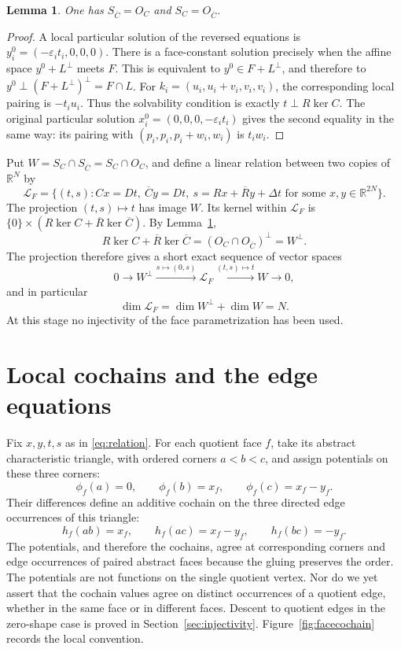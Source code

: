 \documentclass[11pt]{article}
\newtheorem{lemma}[theorem]{Lemma}
\theoremstyle{definition}\newtheorem{definition}[theorem]{Definition}
\theoremstyle{remark}\newtheorem{remark}[theorem]{Remark}
\newcommand{\R}{\mathbb R}
\newcommand{\Ct}{\overline C}
\newcommand{\Rt}{\overline R}
\newcommand{\eps}{\varepsilon}
\begin{document}
\begin{lemma}\label{lem:solvability}
One has $S_{\Ct}=O_C$ and $S_C=O_{\Ct}$.
\end{lemma}
\begin{proof}
A local particular solution of the reversed equations is
$y_i^0=(-\eps_it_i,0,0,0)$. There is a face-constant solution precisely
when the affine space $y^0+L^\perp$ meets $F$. This is equivalent to
$y^0\in F+L^\perp$, and therefore to
$y^0\perp (F+L^\perp)^\perp=F\cap L$. For
$k_i=(u_i,u_i+v_i,v_i,v_i)$, the corresponding local pairing is
$-t_iu_i$. Thus the solvability condition is exactly
$t\perp R\ker C$. The original particular solution
$x_i^0=(0,0,0,-\eps_it_i)$ gives the second equality in the same way:
its pairing with $(p_i,p_i,p_i+w_i,w_i)$ is $t_iw_i$.
\end{proof}

Put $W=S_C\cap S_{\Ct}=S_C\cap O_C$, and define a linear relation
between two copies of $\R^N$ by
\begin{equation}
\mathcal L_F=\{(t,s):Cx=Dt,\ \Ct y=Dt,\
s=Rx+\Rt y+\Delta t\text{ for some }x,y\in\R^{2N}\}.
\label{eq:relation}
\end{equation}
The projection $(t,s)\mapsto t$ has image $W$. Its kernel within
$\mathcal L_F$ is $\{0\}\times(R\ker C+\Rt\ker\Ct)$. By
Lemma~\ref{lem:solvability},
\[
R\ker C+\Rt\ker\Ct=(O_C\cap O_{\Ct})^\perp=W^\perp.
\]
The projection therefore gives a short exact sequence of vector spaces
\[
0\longrightarrow W^\perp\xrightarrow{s\mapsto(0,s)}
\mathcal L_F\xrightarrow{(t,s)\mapsto t}W\longrightarrow0,
\]
and in particular
\begin{equation}
\dim\mathcal L_F=\dim W^\perp+\dim W=N.
\label{eq:dim}
\end{equation}
At this stage no injectivity of the face parametrization has been used.

\section{Local cochains and the edge equations}\label{sec:local}
Fix $x,y,t,s$ as in \eqref{eq:relation}. For each quotient face $f$,
take its abstract characteristic triangle, with ordered corners
$a<b<c$, and assign potentials on these three corners:
\[
\phi_f(a)=0,\qquad\phi_f(b)=x_f,\qquad
\phi_f(c)=x_f-y_f.
\]
Their differences define an additive cochain on the three directed
edge occurrences of this triangle:
\[
h_f(ab)=x_f,\qquad h_f(ac)=x_f-y_f,\qquad h_f(bc)=-y_f.
\]
The potentials, and therefore the cochains, agree at corresponding
corners and edge occurrences of paired abstract faces because the
gluing preserves the order. The potentials are not functions on the
single quotient vertex. Nor do we yet assert that the cochain values
agree on distinct occurrences of a quotient edge, whether in the same
face or in different faces. Descent to quotient edges in the
zero-shape case is proved in Section~\ref{sec:injectivity}.
Figure~\ref{fig:facecochain} records the local convention.
\end{document}
